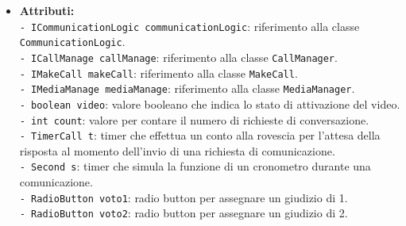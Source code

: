 {\begin{sloppypar}
{{\begin{itemize}
				Tramite le interfacce:
				\begin{itemize}
					\item[] ;
					\item[] ;
					\item[] ;
					\item[] .\\
				\end{itemize}

				\item[]  \textbf{Attributi:} \\

					\texttt{- ICommunicationLogic communicationLogic}: riferimento alla classe 
						\texttt{CommunicationLogic}.\\

					\texttt{- ICallManage callManage}: riferimento alla classe \texttt{CallManager}.\\

					\texttt{- IMakeCall makeCall}: riferimento alla classe \texttt{MakeCall}.\\

					\texttt{- IMediaManage mediaManage}: riferimento alla classe \texttt{MediaManager}.\\

					\texttt{- boolean video}: valore booleano che indica lo stato di attivazione del video.	\\

					\texttt{- int count}: valore per contare il numero di richieste di conversazione.\\

					\texttt{- TimerCall t}: timer che effettua un conto alla rovescia per l'attesa della risposta 
						al momento dell'invio di una richiesta di comunicazione.\\
						
					\texttt{- Second s}: timer che simula la funzione di un cronometro durante una comunicazione.\\

					\texttt{- RadioButton voto1}: radio button per assegnare un giudizio di 1.\\

					\texttt{- RadioButton voto2}: radio button per assegnare un giudizio di 2.\\


\end{itemize}}}
\end{sloppypar}}
